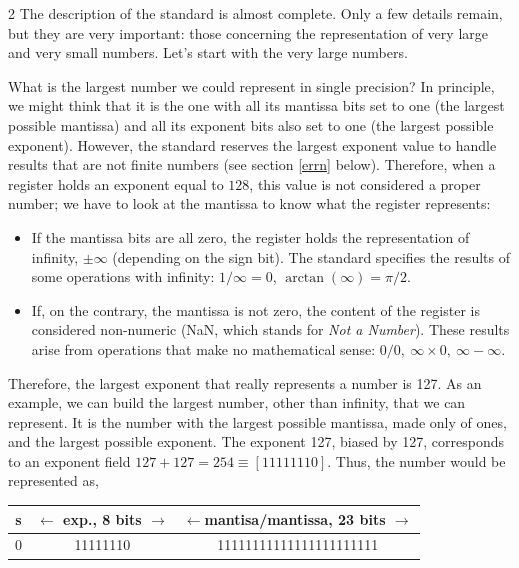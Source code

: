 \begin{paracol}{2}
The description of the standard is almost complete. Only a few details remain, but they are very important: those concerning the representation of very large and very small numbers. Let's start with the very large numbers.

What is the largest number we could represent in single precision? In principle, we might think that it is the one with all its mantissa bits set to one (the largest possible mantissa) and all its exponent bits also set to one (the largest possible exponent). However, the standard reserves the largest exponent value to handle results that are not finite numbers (see section \ref{errn} below). Therefore, when a register holds an exponent equal to $128$, this value is not considered a proper number; we have to look at the mantissa to know what the register represents:
\begin{itemize}
	\item If the mantissa bits are all zero, the register holds the representation of infinity, $\pm\infty$ (depending on the sign bit). The standard specifies the results of some operations with infinity: $1/\infty = 0$, $\arctan(\infty) = \pi/2$.
	\item If, on the contrary, the mantissa is not zero, the content of the register is considered non-numeric (NaN, which stands for \emph{Not a Number}). These results arise from operations that make no mathematical sense: $0/0, \ \infty\times 0,\ \infty -\infty$.
\end{itemize}

 Therefore, the largest exponent that really represents a number is 127.  As an example, we can build the largest number, other than infinity, that we can represent. It is the number with the largest possible mantissa, made only of ones, and the largest possible exponent. The exponent 127, biased by 127, corresponds to an exponent field $127+127=254 \equiv [11111110]$. Thus, the number would be represented as,
\end{paracol}

\begin{center}
\begin{tabular}{|c||c||c|}
\hline
s&$\leftarrow$ exp., 8 bits $\rightarrow$&$\leftarrow$mantisa/mantissa, 23 bits $\rightarrow$\\
\hline
0&11111110&11111111111111111111111\\
\hline
\end{tabular}
\end{center}

